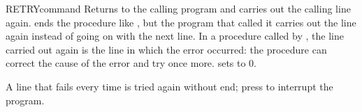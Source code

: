\begin{XbaseEntry}{RETRY}{command}
Returns to the calling program and carries out the calling line again.
\Syntax
{}
\Usage
{} ends the procedure like , but the program that
called it carries out the  line again instead of going on with the
next line.  In a procedure called by , the line carried out
again is the line in which the error occurred: the procedure can correct the
cause of the error and try once more.   sets  to 0.

A line that fails every time is tried again without end; press  to
interrupt the program.
\end{XbaseEntry}

